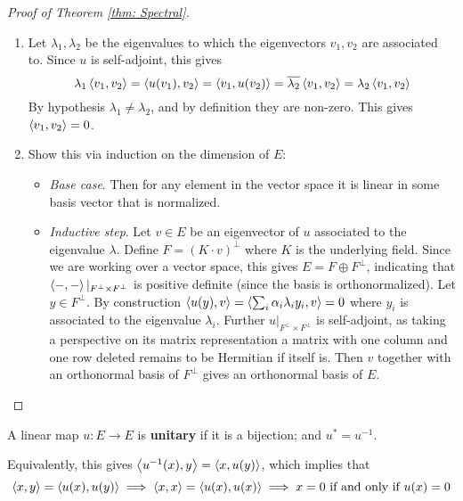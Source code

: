 \begin{proof}[Proof of Theorem \ref{thm: Spectral}]
\begin{enumerate}[label=\roman*)]
\begin{itemize}
            Now consider the corresponding map after the extension of scalar $i_{\C} := u \tensor \Id_{\C}$, which is given by the same matrix representation as that in $E$. By the result in the first case, this is self-adjoint; and since the characteristic polynomial of these two maps are the same, all roots are real numbers.
        \end{itemize}
        \item Let $\lambda_1, \lambda_2$ be the eigenvalues to which the eigenvectors $v_1, v_2$ are associated to. Since $u$ is self-adjoint, this gives
        \[
            \lambda_1 \left\langle v_1, v_2 \right\rangle = \left\langle u(v_1), v_2 \right\rangle = \left\langle v_1, u(v_2) \right\rangle = \overline{\lambda_2}\left\langle v_1, v_2 \right\rangle = \lambda_2 \left\langle v_1, v_2 \right\rangle
        \]
        By hypothesis $\lambda_1 \neq \lambda_2$, and by definition they are non-zero. This gives $\left\langle v_1, v_2 \right\rangle = 0$. 
        \item Show this via induction on the dimension of $E$:
        \begin{itemize}
            \item \emph{Base case}. Then for any element in the vector space it is linear in some basis vector that is normalized. 
            \item \emph{Inductive step}. Let $v \in E$ be an eigenvector of $u$ associated to the eigenvalue $\lambda$. Define $F = (K\cdot v)^{\perp}$ where $K$ is the underlying field. Since we are working over a vector space, this gives $E = F \oplus F^{\perp}$, indicating that $\left\langle -, - \right\rangle|_{F^{\perp} \times F^{\perp}}$ is positive definite (since the basis is orthonormalized). Let $y \in F^{\perp}$. By construction $\left\langle u(y), v \right\rangle = \left\langle \sum_{i} \alpha_i \lambda_i y_i, v \right\rangle = 0$ where $y_i$ is associated to the eigenvalue $\lambda_i$. Further $u|_{F^{\perp} \times F^{\perp}}$ is self-adjoint, as taking a perspective on its matrix representation a matrix with one column and one row deleted remains to be Hermitian if itself is. Then $v$ together with an orthonormal basis of $F^{\perp}$ gives an orthonormal basis of $E$. 
        \end{itemize}
    \end{enumerate}
\end{proof}

\begin{definition}
    A linear map $u: E \to E$ is \textbf{unitary} if it is a bijection; and $u^{\ast} = u^{-1}$.
\end{definition}

\begin{remark}\label{rmk: eq def of unitary}
    Equivalently, this gives $\left\langle u^{-1}(x), y \right\rangle = \left\langle x, u(y) \right\rangle$, which implies that
    \[
        \left\langle x, y \right\rangle = \left\langle u(x), u(y) \right\rangle \implies \left\langle x, x \right\rangle = \left\langle u(x), u(x) \right\rangle \implies x = 0 \text{ if and only if  } u(x) = 0
    \]
\end{remark}

